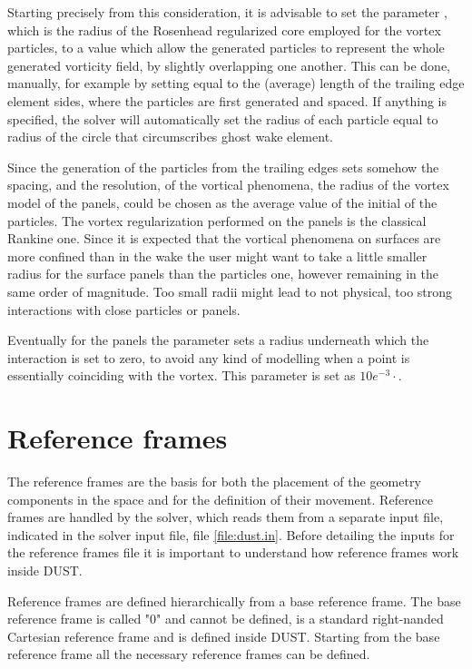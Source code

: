 Starting precisely from this consideration, it is advisable to set the 
parameter , which is the radius of the Rosenhead 
regularized core employed for the vortex particles, to a value which
allow the generated particles to represent the whole generated vorticity 
field, by slightly overlapping one another. This can be done, manually, for example 
by setting  equal to the (average) length of the trailing 
edge element sides, where the particles are first generated and spaced. 
If anything is specified, the solver will automatically set the radius of each particle equal 
to radius of the circle that circumscribes ghost wake element.  

Since the generation of the particles from the trailing edges sets somehow 
the spacing, and the resolution, of the vortical phenomena, the radius of 
the vortex model of the panels,  could be chosen as  
the average value of the initial  of the particles. The vortex 
regularization performed on the panels is the classical Rankine one. 
Since it is expected that the vortical phenomena on surfaces are more 
confined than in the wake the user might want to take a little smaller 
radius for the surface panels than the particles one, however remaining 
in the same order of magnitude. Too small radii might lead to not physical, 
too strong interactions with close particles or panels.

Eventually for the panels the parameter  sets a radius 
underneath which the interaction is set to zero, to avoid any kind of 
modelling when a point is essentially coinciding with the vortex. 
This parameter is set as $10e^{-3}\cdot$. 


\section{Reference frames}
\label{sec:Solver_ReferenceFrames}

The reference frames are the basis for both the placement of the geometry 
components in the space and for the definition of their movement.  
Reference frames are handled by the solver, which reads them from 
a separate input file, indicated in the solver input file, file 
\ref{file:dust.in}. Before detailing the inputs for the reference 
frames file it is important to understand how reference frames work 
inside DUST. %

Reference frames are defined hierarchically from a base reference frame. 
The base reference frame is called "0" and cannot be defined, 
is a standard right-nanded Cartesian reference frame and is defined 
inside DUST. Starting from the base reference frame all the necessary 
reference frames can be defined. 

